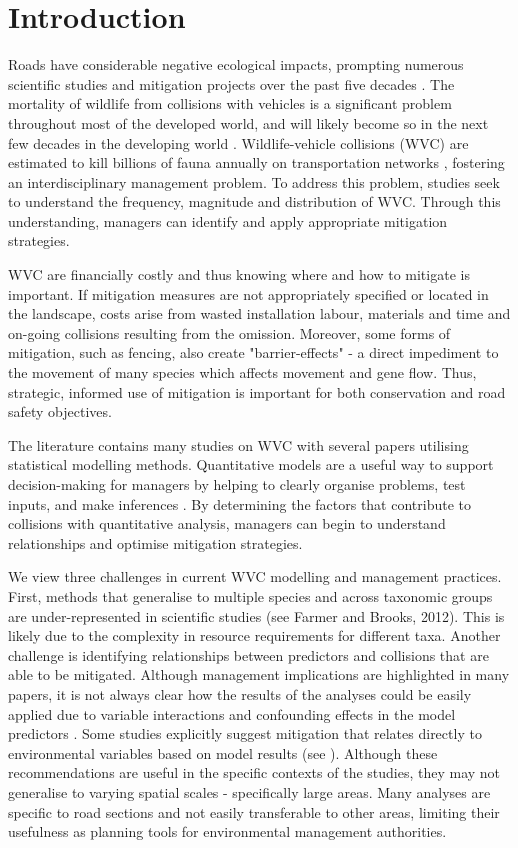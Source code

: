 \newpage
\section{Introduction}

Roads have considerable negative ecological impacts, prompting numerous scientific studies and mitigation projects over the past five decades \citep{form98,spel98,rvdr15}. The mortality of wildlife from collisions with vehicles is a significant problem throughout most of the developed world, and will likely become so in the next few decades in the developing world \citep{rvdr15}. Wildlife-vehicle collisions (WVC) are estimated to kill billions of fauna annually on transportation networks \citep{seil06}, fostering an interdisciplinary management problem. To address this problem, studies seek to understand the frequency, magnitude and distribution of WVC.  Through this understanding, managers can identify and apply appropriate mitigation strategies.

WVC are financially costly \citep{biss08b,huij09,rowd08} and thus knowing where and how to mitigate is important.  If mitigation measures are not appropriately specified or located in the landscape, costs arise from wasted installation labour, materials and time and on-going collisions resulting from the omission.  Moreover, some forms of mitigation, such as fencing, also create "barrier-effects" - a direct impediment to the movement of many species which affects movement and gene flow.  Thus, strategic, informed use of mitigation is important for both conservation and road safety objectives.

The literature contains many studies on WVC with several papers utilising statistical modelling methods.  Quantitative models are a useful way to support decision-making for managers by helping to clearly organise problems, test inputs, and make inferences \citep{ande15}.  By determining the factors that contribute to collisions with quantitative analysis, managers can begin to understand relationships and optimise mitigation strategies.

We view three challenges in current WVC modelling and management practices.  First, methods that generalise to multiple species and across taxonomic groups are under-represented in scientific studies (see Farmer and Brooks, 2012).  This is likely due to the complexity in resource requirements for different taxa.  Another challenge is identifying relationships between predictors and collisions that are able to be mitigated.  Although management implications are highlighted in many papers, it is not always clear how the results of the analyses could be easily applied due to variable interactions and confounding effects in the model predictors \citep{guns11}.  Some studies explicitly suggest mitigation that relates directly to environmental variables based on model results (see \cite{gril09}).  Although these recommendations are useful in the specific contexts of the studies, they may not generalise to varying spatial scales - specifically large areas.  Many analyses are specific to road sections and not easily transferable to other areas, limiting their usefulness as planning tools for environmental management authorities.


